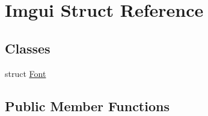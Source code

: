 \hypertarget{struct_imgui}{\section{Imgui Struct Reference}
\label{struct_imgui}
}
\subsection*{Classes}
\begin{DoxyCompactItemize}
\item 
struct \hyperlink{struct_imgui_1_1_font}{Font}
\end{DoxyCompactItemize}
\subsection*{Public Member Functions}
